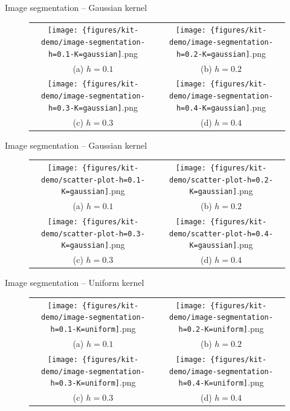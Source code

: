 \documentclass[18pt]{beamer}
\begin{document}
\begin{frame}{Image segmentation -- Gaussian kernel}
\tiny
\begin{figure}
	\begin{tabular}{cc}
		\texttt{[image: \{figures/kit-demo/image-segmentation-h=0.1-K=gaussian]}.png} &   \texttt{[image: \{figures/kit-demo/image-segmentation-h=0.2-K=gaussian]}.png} \\
		(a) $h = 0.1$ & (b) $h = 0.2$ \\[6pt]
		\texttt{[image: \{figures/kit-demo/image-segmentation-h=0.3-K=gaussian]}.png} &   \texttt{[image: \{figures/kit-demo/image-segmentation-h=0.4-K=gaussian]}.png} \\
		(c) $h = 0.3$ & (d) $h = 0.4$ \\[6pt]
	\end{tabular}
\end{figure}
\end{frame}


\begin{frame}{Image segmentation -- Gaussian kernel}
\tiny
\begin{figure}
\begin{tabular}{cc}
	\texttt{[image: \{figures/kit-demo/scatter-plot-h=0.1-K=gaussian]}.png} &   \texttt{[image: \{figures/kit-demo/scatter-plot-h=0.2-K=gaussian]}.png} \\
	(a) $h = 0.1$ & (b) $h = 0.2$ \\[6pt]
	\texttt{[image: \{figures/kit-demo/scatter-plot-h=0.3-K=gaussian]}.png} &   \texttt{[image: \{figures/kit-demo/scatter-plot-h=0.4-K=gaussian]}.png} \\
	(c) $h = 0.3$ & (d) $h = 0.4$ \\[6pt]
\end{tabular}
\end{figure}
\end{frame}


\begin{frame}{Image segmentation -- Uniform kernel}
\tiny
\begin{figure}
\begin{tabular}{cc}
\texttt{[image: \{figures/kit-demo/image-segmentation-h=0.1-K=uniform]}.png} &   \texttt{[image: \{figures/kit-demo/image-segmentation-h=0.2-K=uniform]}.png} \\
(a) $h = 0.1$ & (b) $h = 0.2$ \\[6pt]
\texttt{[image: \{figures/kit-demo/image-segmentation-h=0.3-K=uniform]}.png} &   \texttt{[image: \{figures/kit-demo/image-segmentation-h=0.4-K=uniform]}.png} \\
(c) $h = 0.3$ & (d) $h = 0.4$ \\[6pt]
\end{tabular}
\end{figure}
\end{frame}
\end{document}
